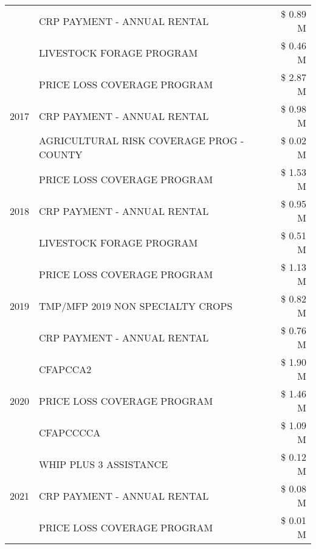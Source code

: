 \begin{tabular}{llr}
 & CRP PAYMENT - ANNUAL RENTAL & \$ 0.89 M \\
 & LIVESTOCK FORAGE PROGRAM & \$ 0.46 M \\
\cline{1-3}
\multirow[t]{3}{*}{2017} & PRICE LOSS COVERAGE PROGRAM & \$ 2.87 M \\
 & CRP PAYMENT - ANNUAL RENTAL & \$ 0.98 M \\
 & AGRICULTURAL RISK COVERAGE PROG - COUNTY & \$ 0.02 M \\
\cline{1-3}
\multirow[t]{3}{*}{2018} & PRICE LOSS COVERAGE PROGRAM & \$ 1.53 M \\
 & CRP PAYMENT - ANNUAL RENTAL & \$ 0.95 M \\
 & LIVESTOCK FORAGE PROGRAM & \$ 0.51 M \\
\cline{1-3}
\multirow[t]{3}{*}{2019} & PRICE LOSS COVERAGE PROGRAM & \$ 1.13 M \\
 & TMP/MFP 2019 NON SPECIALTY CROPS & \$ 0.82 M \\
 & CRP PAYMENT - ANNUAL RENTAL & \$ 0.76 M \\
\cline{1-3}
\multirow[t]{3}{*}{2020} & CFAPCCA2 & \$ 1.90 M \\
 & PRICE LOSS COVERAGE PROGRAM & \$ 1.46 M \\
 & CFAPCCCCA & \$ 1.09 M \\
\cline{1-3}
\multirow[t]{3}{*}{2021} & WHIP PLUS 3 ASSISTANCE & \$ 0.12 M \\
 & CRP PAYMENT - ANNUAL RENTAL & \$ 0.08 M \\
 & PRICE LOSS COVERAGE PROGRAM & \$ 0.01 M \\
\cline{1-3}
\bottomrule
\end{tabular}

